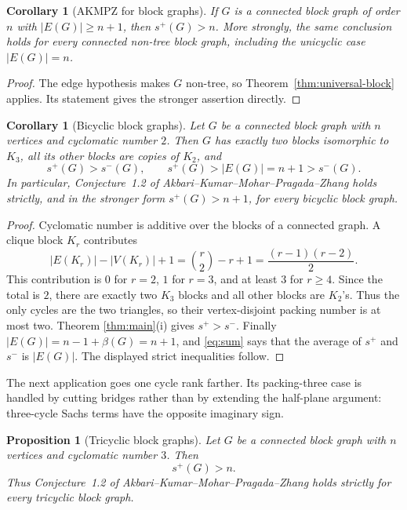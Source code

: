 \documentclass[11pt]{article}
\newtheorem{corollary}[theorem]{Corollary}
\newtheorem{proposition}[theorem]{Proposition}
\theoremstyle{definition}
\theoremstyle{remark}
\begin{document}
\begin{corollary}[AKMPZ for block graphs]\label{cor:AKMPZ-block}
If $G$ is a connected block graph of order $n$ with $|E(G)|\ge n+1$, then
$s^+(G)>n$.  More strongly, the same conclusion holds for every connected
non-tree block graph, including the unicyclic case $|E(G)|=n$.
\end{corollary}

\begin{proof}
The edge hypothesis makes $G$ non-tree, so Theorem~\ref{thm:universal-block}
applies.  Its statement gives the stronger assertion directly.
\end{proof}

\begin{corollary}[Bicyclic block graphs]\label{cor:block}
Let $G$ be a connected block graph with $n$ vertices and cyclomatic
number $2$.  Then $G$ has exactly two blocks isomorphic to $K_3$, all its
other blocks are copies of $K_2$, and
\[
 s^+(G)>s^-(G),
 \qquad
 s^+(G)>|E(G)|=n+1>s^-(G).
\]
In particular, Conjecture~1.2 of Akbari--Kumar--Mohar--Pragada--Zhang
\cite{AKMPZ} holds strictly, and in the stronger form $s^+(G)>n+1$, for
every bicyclic block graph.
\end{corollary}

\begin{proof}
Cyclomatic number is additive over the blocks of a connected graph.  A
clique block $K_r$ contributes
\[
 |E(K_r)|-|V(K_r)|+1
 =\binom r2-r+1=\frac{(r-1)(r-2)}2.
\]
This contribution is $0$ for $r=2$, $1$ for $r=3$, and at least $3$ for
$r\ge4$.  Since the total is $2$, there are exactly two $K_3$ blocks and
all other blocks are $K_2$'s.  Thus the only cycles are the two triangles,
so their vertex-disjoint packing number is at most two.  Theorem
\ref{thm:main}(i) gives $s^+>s^-$.  Finally $|E(G)|=n-1+\beta(G)=n+1$,
and \eqref{eq:sum} says that the average of $s^+$ and $s^-$ is $|E(G)|$.
The displayed strict inequalities follow.
\end{proof}

The next application goes one cycle rank farther.  Its packing-three case is
handled by cutting bridges rather than by extending the half-plane argument:
three-cycle Sachs terms have the opposite imaginary sign.

\begin{proposition}[Tricyclic block graphs]\label{prop:tricyclic-block}
Let $G$ be a connected block graph with $n$ vertices and cyclomatic number
$3$.  Then
\[
 s^+(G)>n.
\]
Thus Conjecture~1.2 of Akbari--Kumar--Mohar--Pragada--Zhang holds strictly
for every tricyclic block graph.
\end{proposition}
\end{document}
